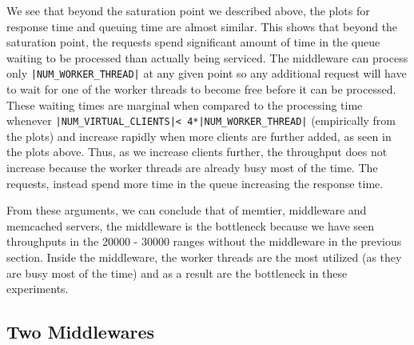 \documentclass[11pt,a4paper]{article}
\newcommand\instructions[1]{\textcolor{blue}{Instructions: #1}}
\begin{document}
We see that beyond the saturation point we described above, the plots for response time and queuing time are almost similar. This shows that beyond the saturation point, the requests spend significant amount of time in the queue waiting to be processed than actually being serviced. The middleware can process only \texttt{|NUM\_WORKER\_THREAD|} at any given point so any additional request will have to wait for one of the worker threads to become free before it can be processed. These waiting times are marginal when compared to the processing time whenever \texttt{|NUM\_VIRTUAL\_CLIENTS|< 4*|NUM\_WORKER\_THREAD|} (empirically from the plots) and increase rapidly when more clients are further added, as seen in the plots above.
Thus, as we increase clients further, the throughput does not increase because the worker threads are already busy most of the time. The requests, instead spend more time in the queue increasing the response time.

From these arguments, we can conclude that of memtier, middleware and memcached servers, the middleware is the bottleneck because we have seen throughputs in the 20000 - 30000 ranges without the middleware in the previous section. Inside the middleware, the worker threads are the most utilized (as they are busy most of the time) and as a result are the bottleneck in these experiments.

\subsection{Two Middlewares}

\end{document}
